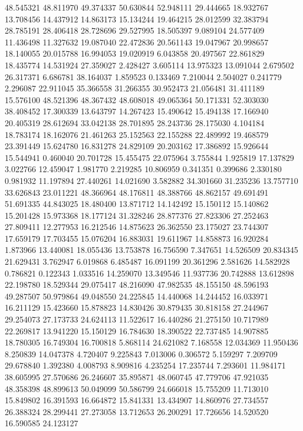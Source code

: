 48.545321
48.811970
49.374337
50.630844
52.948111
29.444665
18.932767
13.708456
14.437912
14.863173
15.134244
19.464215
28.012599
32.383794
28.785191
28.406418
28.728696
29.527995
18.505397
9.089104
24.577409
11.436498
11.327632
19.087040
22.472836
20.561143
19.047967
20.998657
18.140055
20.015788
16.994053
19.020919
6.043858
20.497567
22.861829
18.435774
14.531924
27.359027
2.428427
3.605114
13.975323
13.091044
2.679502
26.317371
6.686781
38.164037
1.859523
0.133469
7.210044
2.504027
0.241779
2.296087
22.911045
35.366558
31.266355
30.952473
21.056481
31.411189
15.576100
48.521396
48.367432
48.608018
49.065364
50.171331
52.303030
38.408452
17.300339
13.643797
14.267423
15.490642
15.494138
17.166940
20.405319
28.612694
33.042138
28.701895
28.243736
28.175030
4.104184
18.783174
18.162076
21.461263
25.152563
22.155288
22.489992
19.468579
23.391449
15.624780
16.831278
24.829109
20.203162
17.386892
15.926644
15.544941
0.460040
20.701728
15.455475
22.075964
3.755844
1.925819
17.137829
3.022766
12.459047
1.981770
2.219285
10.806959
0.341351
0.399686
2.330180
0.981932
11.197894
27.440261
14.021690
3.582882
34.301660
31.235236
13.757710
33.626843
23.011221
48.366964
48.176811
48.388766
48.862157
49.691491
51.691335
44.843025
18.480400
13.871712
14.142492
15.150112
15.140862
15.201428
15.973368
18.177124
31.328246
28.877376
27.823306
27.252463
27.809411
12.277953
16.212546
14.875623
26.362550
23.175027
23.744307
17.659179
17.703455
15.076204
16.883031
19.611967
14.858873
16.920284
1.873966
13.440081
18.055436
13.753878
16.756590
7.347651
14.526509
20.834345
21.629431
3.762947
6.019868
6.485487
16.091199
20.361296
2.581626
14.582928
0.786821
0.122343
1.033516
14.259070
13.349546
11.937736
20.742888
13.612898
22.198780
18.529344
29.075417
48.216090
47.982535
48.155150
48.596193
49.287507
50.979864
49.048550
24.225845
14.440068
14.244452
16.033971
16.211129
15.423660
15.878823
14.830426
30.879435
30.818158
27.244967
29.254073
27.173733
24.624113
11.522617
16.440286
21.275150
10.717989
22.269817
13.941220
15.150129
16.784630
18.390522
22.737485
14.907885
18.780305
16.749304
16.700818
5.868114
24.621082
7.168558
12.034369
11.950436
8.250839
14.047378
4.720407
9.225843
7.013006
0.306572
5.159297
7.209709
29.678840
1.392380
4.008793
8.909816
4.235254
17.235744
7.293601
11.984171
38.605995
27.570686
26.246607
35.895871
48.060745
47.779706
47.921035
48.358398
48.899613
50.049099
50.586799
24.666018
15.755209
11.713010
15.849802
16.391593
16.664872
15.841331
13.434907
14.860976
27.734557
26.388324
28.299441
27.273058
13.712653
26.200291
17.726656
14.520520
16.590585
24.123127
